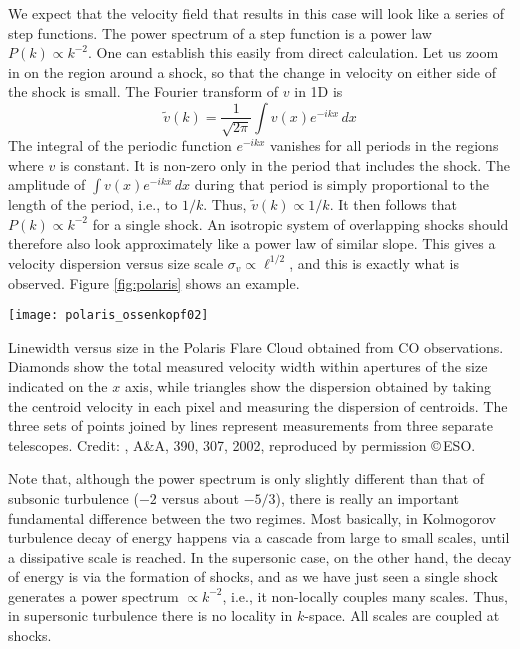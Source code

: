 We expect that the velocity field that results in this case will look like a series of step functions. The power spectrum of a step function is a power law $P(k)\propto k^{-2}$. One can establish this easily from direct calculation. Let us zoom in on the region around a shock, so that the change in velocity on either side of the shock is small. The Fourier transform of $v$ in 1D is
\begin{equation}
\tilde{v}(k) = \frac{1}{\sqrt{2\pi}} \int v(x) e^{-i kx}\, dx
\end{equation}
The integral of the periodic function $e^{-ikx}$ vanishes for all periods in the regions where $v$ is constant. It is non-zero only in the period that includes the shock. The amplitude of $\int v(x) e^{-i kx}\, dx$ during that period is simply proportional to the length of the period, i.e., to $1/k$. Thus, $\tilde{v}(k)\propto 1/k$. It then follows that $P(k)\propto k^{-2}$ for a single shock. An isotropic system of overlapping shocks should therefore also look approximately like a power law of similar slope. This gives a velocity dispersion versus size scale $\sigma_v\propto \ell^{1/2}$, and this is exactly what is observed. Figure \ref{fig:polaris} shows an example.

\begin{marginfigure}
\texttt{[image: polaris\_ossenkopf02]}
\caption[Linewidth versus size in the Polaris Flare cloud]{
\label{fig:polaris}
Linewidth versus size in the Polaris Flare Cloud obtained from CO observations. Diamonds show the total measured velocity width within apertures of the size indicated on the $x$ axis, while triangles show the dispersion obtained by taking the centroid velocity in each pixel and measuring the dispersion of centroids. The three sets of points joined by lines represent measurements from three separate telescopes. Credit: \citeauthor{ossenkopf02a}, A\&A, 390, 307, 2002, reproduced by permission \copyright\,ESO.
}
\end{marginfigure}

Note that, although the power spectrum is only slightly different than that of subsonic turbulence ($-2$ versus about $-5/3$), there is really an important fundamental difference between the two regimes. Most basically, in Kolmogorov turbulence decay of energy happens via a cascade from large to small scales, until a dissipative scale is reached. In the supersonic case, on the other hand, the decay of energy is via the formation of shocks, and as we have just seen a single shock generates a power spectrum $\propto k^{-2}$, i.e., it non-locally couples many scales. Thus, in supersonic turbulence there is no locality in $k$-space. All scales are coupled at shocks.

